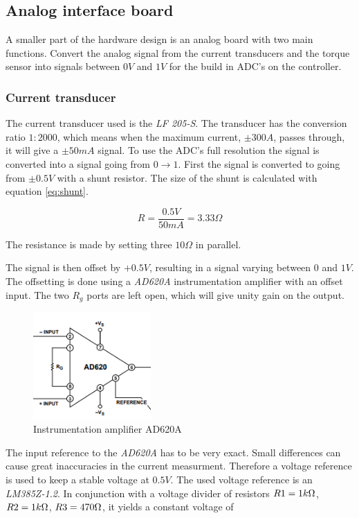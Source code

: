 \subsection{Analog interface board}
A smaller part of the hardware design is an analog board with two main functions. Convert the analog signal from the current transducers and the torque sensor into signals between $0V$ and $1V$ for the build in ADC's on the controller.

\subsubsection{Current transducer}
The current transducer used is the \textit{LF 205-S}. The transducer has the conversion ratio $1:2000$, which means when the maximum current, $\pm 300A$, passes through, it will give a $\pm 50mA$ signal. To use the ADC's full resolution the signal is converted into a signal going from $0\rightarrow 1$. First the signal is converted to going from $\pm 0.5V$ with a shunt resistor. The size of the shunt is calculated with equation \ref{eq:shunt}.

\begin{equation}
	R = \frac{0.5V}{50mA} = 3.33\Omega
	\label{eq:shunt}
\end{equation}

The resistance is made by setting three $10 \Omega$ in parallel.

The signal is then offset by $+0.5V$, resulting in a signal varying between $0$ and $1V$. The offsetting is done using a \textit{AD620A} instrumentation amplifier with an offset input. The two $R_g$ ports are left open, which will give unity gain on the output.

\begin{figure}[H]
	\centering
	\includegraphics[width=0.4\textwidth]{pictures/hardware/Analog_Interface_board/AD620A.PNG}
	\caption{Instrumentation amplifier AD620A}
	\label{fig:AD620A}
\end{figure} 

The input reference to the \textit{AD620A} has to be very exact. Small differences can cause great inaccuracies in the current measurment. Therefore a voltage reference is used to keep a stable voltage at $0.5V$. The used voltage reference is an \textit{LM385Z-1.2}. In conjunction with a voltage divider of resistors $R1 = 1k\ohm$, $R2 = 1k\ohm$, $R3 = 470\ohm$, it yields a constant voltage of

